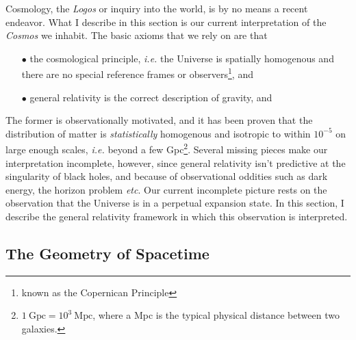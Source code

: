 \vspace*{1pc}

Cosmology, the \textit{Logos} or inquiry into the world, is by no means a recent endeavor. What I describe in this section is our current interpretation of the \textit{Cosmos} we inhabit. The basic axioms that we rely on are that \\
\begin{itemize}
\item[$\bullet$] the cosmological principle, \textit{i.e.} the Universe is spatially homogenous and there are no special reference frames or observers\footnote{known as the Copernican Principle}, and
\item[$\bullet$] general relativity is the correct description of gravity, and \\
\end{itemize} The former is observationally motivated, and it has been proven that the distribution of matter is \emph{statistically} homogenous and isotropic to within $10^{-5}$ on large enough scales, \textit{i.e.} beyond a few Gpc\footnote{$1~\mathrm{Gpc} = 10^3~\mathrm{Mpc}$, where a Mpc is the typical physical distance between two galaxies.}. Several missing pieces make our interpretation incomplete, however, since general relativity isn't predictive at the singularity of black holes, and because of observational oddities such as dark energy, the horizon problem \textit{etc}. Our current incomplete picture rests on the observation that the Universe is in a perpetual expansion state. In this section, I describe the general relativity framework in which this observation is interpreted.

\subsection{The Geometry of Spacetime}

